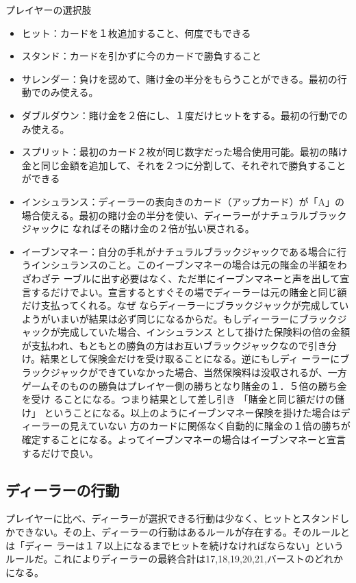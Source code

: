プレイヤーの選択肢
\begin{itemize}
\item ヒット：カードを１枚追加すること、何度でもできる
\item スタンド：カードを引かずに今のカードで勝負すること
\item サレンダー：負けを認めて、賭け金の半分をもらうことができる。最初の行動でのみ使える。
\item ダブルダウン：賭け金を２倍にし、１度だけヒットをする。最初の行動でのみ使える。
\item スプリット：最初のカード２枚が同じ数字だった場合使用可能。最初の賭け金と同じ金額を追加して、それを２つに分割して、それぞれで勝負することができる
\item インシュランス：ディーラーの表向きのカード（アップカード）が「A」の場合使える。最初の賭け金の半分を使い、ディーラーがナチュラルブラックジャックに
なればその賭け金の２倍が払い戻される。
\item イーブンマネー：自分の手札がナチュラルブラックジャックである場合に行うインシュランスのこと。このイーブンマネーの場合は元の賭金の半額をわざわざテ
ーブルに出す必要はなく、ただ単にイーブンマネーと声を出して宣言するだけでよい。宣言するとすぐその場でディーラーは元の賭金と同じ額だけ支払ってくれる。なぜ
ならディーラーにブラックジャックが完成していようがいまいが結果は必ず同じになるからだ。もしディーラーにブラックジャックが完成していた場合、インシュランス
として掛けた保険料の倍の金額が支払われ、もともとの勝負の方はお互いブラックジャックなので引き分け。結果として保険金だけを受け取ることになる。逆にもしディ
ーラーにブラックジャックができていなかった場合、当然保険料は没収されるが、一方ゲームそのものの勝負はプレイヤー側の勝ちとなり賭金の１．５倍の勝ち金を受け
ることになる。つまり結果として差し引き 「賭金と同じ額だけの儲け」 ということになる。以上のようにイーブンマネー保険を掛けた場合はディーラーの見えていない
方のカードに関係なく自動的に賭金の１倍の勝ちが確定することになる。よってイーブンマネーの場合はイーブンマネーと宣言するだけで良い。
\end{itemize}

\subsection{ディーラーの行動}
プレイヤーに比べ、ディーラーが選択できる行動は少なく、ヒットとスタンドしかできない。その上、ディーラーの行動はあるルールが存在する。そのルールとは「ディー
ラーは１７以上になるまでヒットを続けなければならない」というルールだ。これによりディーラーの最終合計は17,18,19,20,21,バーストのどれかになる。

